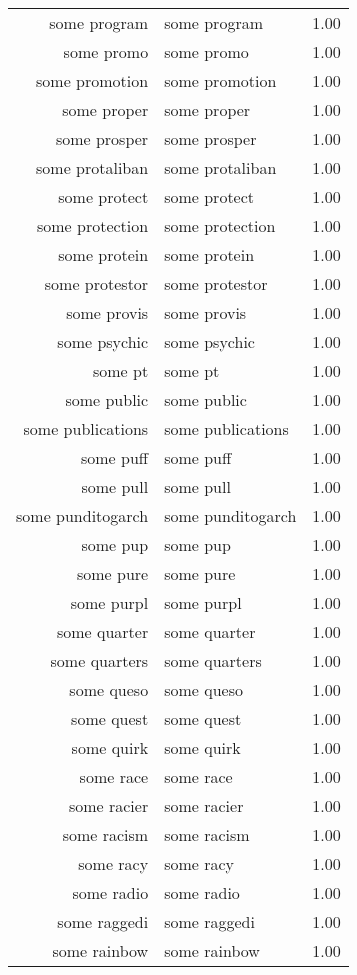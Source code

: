 \begin{table}[ht]
\begin{tabular}{rlr}
  some program & some program & 1.00 \\ 
  some promo & some promo & 1.00 \\ 
  some promotion & some promotion & 1.00 \\ 
  some proper & some proper & 1.00 \\ 
  some prosper & some prosper & 1.00 \\ 
  some protaliban & some protaliban & 1.00 \\ 
  some protect & some protect & 1.00 \\ 
  some protection & some protection & 1.00 \\ 
  some protein & some protein & 1.00 \\ 
  some protestor & some protestor & 1.00 \\ 
  some provis & some provis & 1.00 \\ 
  some psychic & some psychic & 1.00 \\ 
  some pt & some pt & 1.00 \\ 
  some public & some public & 1.00 \\ 
  some publications & some publications & 1.00 \\ 
  some puff & some puff & 1.00 \\ 
  some pull & some pull & 1.00 \\ 
  some punditogarch & some punditogarch & 1.00 \\ 
  some pup & some pup & 1.00 \\ 
  some pure & some pure & 1.00 \\ 
  some purpl & some purpl & 1.00 \\ 
  some quarter & some quarter & 1.00 \\ 
  some quarters & some quarters & 1.00 \\ 
  some queso & some queso & 1.00 \\ 
  some quest & some quest & 1.00 \\ 
  some quirk & some quirk & 1.00 \\ 
  some race & some race & 1.00 \\ 
  some racier & some racier & 1.00 \\ 
  some racism & some racism & 1.00 \\ 
  some racy & some racy & 1.00 \\ 
  some radio & some radio & 1.00 \\ 
  some raggedi & some raggedi & 1.00 \\ 
  some rainbow & some rainbow & 1.00 \\ 

\end{tabular}
\end{table}
